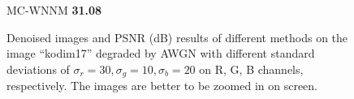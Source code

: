 \begin{figure}
{\begin{minipage}[t]{0.19\textwidth}
{\footnotesize MC-WNNM \textbf{31.08}}
\end{minipage}
}
\caption{Denoised images and PSNR (dB) results of different methods on the image ``kodim17'' degraded by AWGN with different standard deviations of $\sigma_{r}=30, \sigma_{g}=10, \sigma_{b}=20$ on R, G, B channels, respectively. The images are better to be zoomed in on screen.}
    \label{fig4-4}
\end{figure}


\begin{figure}
    \centering
{}
\end{figure}
